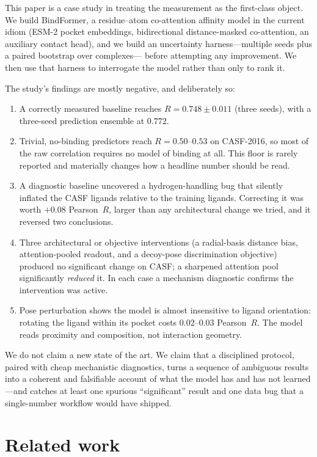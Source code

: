 \documentclass[11pt]{article}
\newcommand{\pearson}{Pearson~$R$}
\begin{document}
This paper is a case study in treating the measurement as the first-class object. We build
BindFormer, a residue--atom co-attention affinity model in the current idiom (ESM-2 pocket
embeddings, bidirectional distance-masked co-attention, an auxiliary contact head), and we
build an uncertainty harness---multiple seeds plus a paired bootstrap over complexes---%
before attempting any improvement. We then use that harness to interrogate the model rather
than only to rank it.

The study's findings are mostly negative, and deliberately so:

\begin{enumerate}
\item A correctly measured baseline reaches $R=0.748\pm0.011$ (three seeds), with a
three-seed prediction ensemble at $0.772$.
\item Trivial, no-binding predictors reach $R=0.50$--$0.53$ on CASF-2016, so most of the
raw correlation requires no model of binding at all. This floor is rarely reported and
materially changes how a headline number should be read.
\item A diagnostic baseline uncovered a hydrogen-handling bug that silently inflated the
CASF ligands relative to the training ligands. Correcting it was worth $+0.08$ \pearson{},
larger than any architectural change we tried, and it reversed two conclusions.
\item Three architectural or objective interventions (a radial-basis distance bias,
attention-pooled readout, and a decoy-pose discrimination objective) produced no
significant change on CASF; a sharpened attention pool significantly \emph{reduced} it. In
each case a mechanism diagnostic confirms the intervention was active.
\item Pose perturbation shows the model is almost insensitive to ligand orientation:
rotating the ligand within its pocket costs $0.02$--$0.03$ \pearson{}. The model reads
proximity and composition, not interaction geometry.
\end{enumerate}

We do not claim a new state of the art. We claim that a disciplined protocol, paired with
cheap mechanistic diagnostics, turns a sequence of ambiguous results into a coherent and
falsifiable account of what the model has and has not learned---and catches at least one
spurious ``significant'' result and one data bug that a single-number workflow would have
shipped.

\section{Related work}
\end{document}
